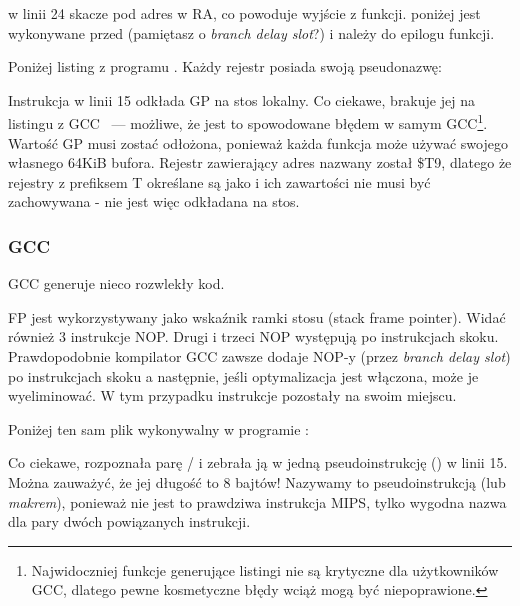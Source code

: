  w linii 24 skacze pod adres w \ac{RA}, co powoduje wyjście z funkcji.
 poniżej  jest wykonywane przed  (pamiętasz o \emph{branch delay slot}?) i należy do epilogu funkcji.

Poniżej listing z programu \IDA. Każdy rejestr posiada swoją pseudonazwę:



Instrukcja w linii 15 odkłada GP na stos lokalny. Co ciekawe, brakuje jej na listingu z GCC ~--- możliwe, że jest to spowodowane błędem w samym GCC\footnote{Najwidoczniej funkcje generujące listingi nie są krytyczne
dla użytkowników GCC, dlatego pewne kosmetyczne błędy wciąż mogą być niepoprawione.}.
Wartość GP musi zostać odłożona, ponieważ każda funkcja może używać swojego własnego 64KiB bufora.
Rejestr zawierający adres \puts nazwany został \$T9, dlatego że rejestry z prefiksem T określane są jako  i ich zawartości nie musi być zachowywana - nie jest więc odkładana na stos.

\subsubsection{\NonOptimizing GCC}

\NonOptimizing GCC generuje nieco rozwlekły kod.



FP jest wykorzystywany jako wskaźnik ramki stosu (stack frame pointer).
Widać również 3 instrukcje \ac{NOP}.
Drugi i trzeci \ac{NOP} występują po instrukcjach skoku.
Prawdopodobnie kompilator GCC zawsze dodaje \ac{NOP}-y (przez \emph{branch delay slot})
po instrukcjach skoku a następnie, jeśli optymalizacja jest włączona, może je wyeliminować.
W tym przypadku instrukcje pozostały na swoim miejscu.

Poniżej ten sam plik wykonywalny w programie \IDA:



Co ciekawe, \IDA rozpoznała parę / i zebrała ją w jedną pseudoinstrukcję
 () w linii 15.
Można zauważyć, że jej długość to 8 bajtów!
Nazywamy to pseudoinstrukcją (lub \emph{makrem}), ponieważ nie jest to prawdziwa instrukcja MIPS, tylko wygodna nazwa dla pary dwóch powiązanych instrukcji.

